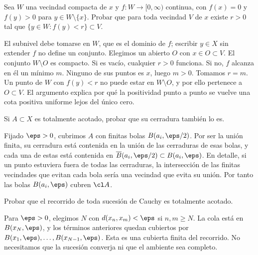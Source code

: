 \begin{ejercicio}\label{ej:lectura-14-6}
Sea $W$ una vecindad compacta de $x$ y $f:W\to[0,\infty)$ continua, con $f(x)=0$ y $f(y)>0$ para $y\in W\setminus\{x\}$. Probar que para toda vecindad $V$ de $x$ existe $r>0$ tal que $\{y\in W:f(y)<r\}\subset V$.
\end{ejercicio}
\begin{solucion}
El subnivel debe tomarse en $W$, que es el dominio de $f$; escribir $y\in X$ sin extender $f$ no define un conjunto. Elegimos un abierto $O$ con $x\in O\subset V$. El conjunto $W\setminus O$ es compacto. Si es vacío, cualquier $r>0$ funciona. Si no, $f$ alcanza en él un mínimo $m$. Ninguno de sus puntos es $x$, luego $m>0$. Tomamos $r=m$. Un punto de $W$ con $f(y)<r$ no puede estar en $W\setminus O$, y por ello pertenece a $O\subset V$. El argumento explica por qué la positividad punto a punto se vuelve una cota positiva uniforme lejos del único cero.
\end{solucion}

\begin{ejercicio}\label{ej:lectura-15-1}
Si $A\subset X$ es totalmente acotado, probar que su cerradura también lo es.
\end{ejercicio}
\begin{solucion}
Fijado $\eps>0$, cubrimos $A$ con finitas bolas $B(a_i,\eps/2)$. Por ser la unión finita, su cerradura está contenida en la unión de las cerraduras de esas bolas, y cada una de estas está contenida en $\overline B(a_i,\eps/2)\subset B(a_i,\eps)$. En detalle, si un punto estuviera fuera de todas las cerraduras, la intersección de las finitas vecindades que evitan cada bola sería una vecindad que evita su unión. Por tanto las bolas $B(a_i,\eps)$ cubren $\cl A$.
\end{solucion}

\begin{ejercicio}\label{ej:lectura-15-2}
Probar que el recorrido de toda sucesión de Cauchy es totalmente acotado.
\end{ejercicio}
\begin{solucion}
Para $\eps>0$, elegimos $N$ con $d(x_n,x_m)<\eps$ si $n,m\ge N$. La cola está en $B(x_N,\eps)$, y los términos anteriores quedan cubiertos por $B(x_1,\eps),\ldots,B(x_{N-1},\eps)$. Esta es una cubierta finita del recorrido. No necesitamos que la sucesión converja ni que el ambiente sea completo.
\end{solucion}

